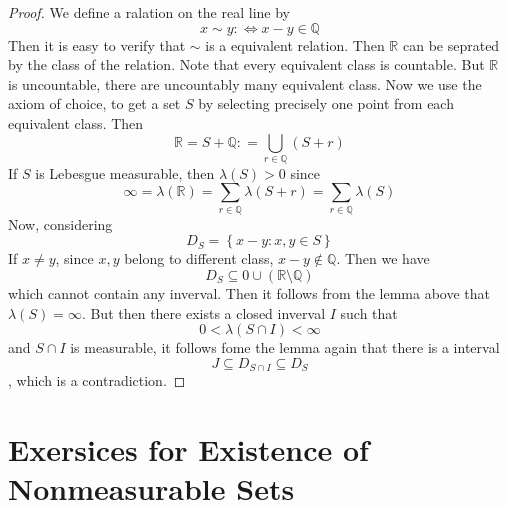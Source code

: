 \documentclass[../main.tex]{subfiles}
\begin{document}
\begin{proof}
    We define a ralation on the real line by \[
    x \sim y:\iff  x-y \in \mathbb{Q} 
    \]Then it is easy to verify that \(  \sim   \) is a equivalent relation. Then \(  \mathbb{R}   \) can be seprated by the class of the relation. Note that every equivalent class is countable. But \(  \mathbb{R}   \) is uncountable, there are uncountably many equivalent class. Now we use the axiom of choice, to get a set \(  S  \) by selecting precisely one point from each equivalent class. Then \[
    \mathbb{R} = S+ \mathbb{Q}: = \bigcup _{ r \in \mathbb{Q} }\left( S+ r \right)  
    \] If \(  S  \) is Lebesgue measurable, then \(   \lambda \left( S \right)> 0   \) since \[
    \infty=  \lambda \left( \mathbb{R}  \right)= \sum _{r \in \mathbb{Q} } \lambda \left( S+ r \right)= \sum _{r\in \mathbb{Q} } \lambda \left( S \right)   
    \] Now, considering \[
    D_{S}= \left\{ x-y: x,y \in S\right\}
    \]If \(  x\neq y  \), since \(  x,y  \) belong to different class, \(  x-y\not \in \mathbb{Q}   \).   Then we have \[
    D_{S}\subseteq 0\cup  \left( \mathbb{R} \setminus \mathbb{Q}  \right) 
    \] which cannot contain any inverval. Then it follows from the lemma above that \(   \lambda \left( S \right)= \infty   \). But then there exists a closed inverval \(  I   \) such that  \[
    0<  \lambda \left( S\cap I \right)< \infty 
    \] and \(  S\cap I   \) is measurable, it follows fome the lemma again that there is a interval \[
    J\subseteq D_{S\cap I}\subseteq D_{S}
    \] , which is a contradiction.
\end{proof}

\section*{Exersices for Existence of Nonmeasurable Sets}
\end{document}
